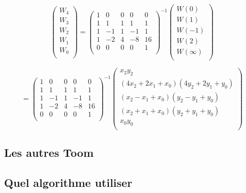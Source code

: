 \documentclass[letterpaper]{article}
\begin{document}
$$
\begin{pmatrix}
  W_4 \\
  W_3 \\
  W_2 \\
  W_1 \\
  W_0 \\
 \end{pmatrix}
=
\begin{pmatrix}
  1 & 0 & 0 & 0 & 0 \\
  1 & 1 & 1 & 1 & 1 \\
  1 &-1 & 1 &-1 & 1 \\
  1 &-2 & 4 &-8 &16 \\
  0 & 0 & 0 & 0 & 1 \\
\end{pmatrix}^{-1}
\begin{pmatrix}
  W (0) \\
  W (1) \\
  W (-1) \\
  W (2) \\
  W (\infty) \\
\end{pmatrix}
$$

$$
=
\begin{pmatrix}
  1 & 0 & 0 & 0 & 0 \\
  1 & 1 & 1 & 1 & 1 \\
  1 &-1 & 1 &-1 & 1 \\
  1 &-2 & 4 &-8 &16 \\
  0 & 0 & 0 & 0 & 1 \\
\end{pmatrix}^{-1}
\begin{pmatrix}
  x_2y_2 \\
  (4x_2 + 2x_1 + x_0) (4y_2+ 2y_1 + y_0)\\
  (x_2 - x_1 + x_0) (y_2 - y_1 + y_0)\\
  (x_2 + x_1 + x_0) (y_2 + y_1 + y_0)\\
  x_0y_0\\
\end{pmatrix}
$$

\subsection{Les autres Toom}

\subsection{Quel algorithme utiliser}
\end{document}
